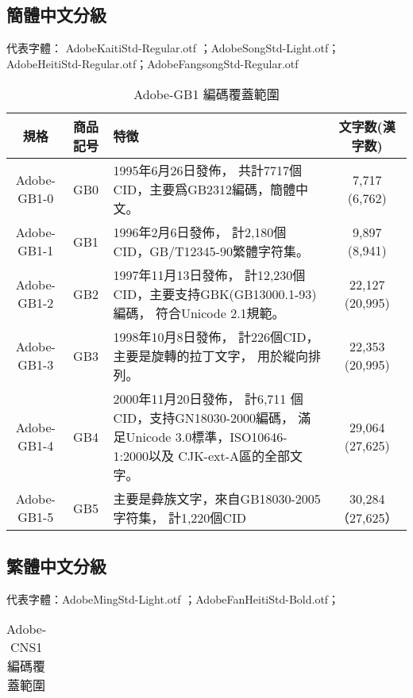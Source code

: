 \documentclass[a4,11pt,uplatex,openleft]{jsarticle}
\begin{document}
\begin{appendix}
\clearpage
\subsection{簡體中文分級}
{\gtfamily 代表字體： AdobeKaitiStd-Regular.otf ；AdobeSongStd-Light.otf；\\
\qquad \qquad \qquad AdobeHeitiStd-Regular.otf；AdobeFangsongStd-Regular.otf}
\begin{table}[h]
\caption{\fontsize{12pt}{15pt}\selectfont Adobe-GB1 編碼覆蓋範圍} %
\centering %
\begin{tabular}{|c|c|p{7cm}|c|}%
\hline  %

規格 & 商品記号	& 特徴	 & 文字数(漢字数) \\

\hline  %
Adobe-GB1-0 &	GB0	 & 1995年6月26日發佈，
共計7717個CID，主要爲GB2312編碼，簡體中文。
& 7,717 (6,762) \\
\hline
Adobe-GB1-1	& GB1 &	1996年2月6日發佈，
計2,180個CID，GB/T12345-90繁體字符集。
& 	9,897 (8,941) \\
\hline
Adobe-GB1-2	& GB2	 &  1997年11月13日發佈，
計12,230個CID，主要支持GBK(GB13000.1-93)編碼，
符合Unicode 2.1規範。 & 22,127 (20,995) \\
\hline

Adobe-GB1-3	& GB3	&   1998年10月8日發佈，
計226個CID，主要是旋轉的拉丁文字，
用於縱向排列。 & 22,353 (20,995) \\

\hline
Adobe-GB1-4	& GB4 & 2000年11月20日發佈，
計6,711 個CID，支持GN18030-2000編碼，
滿足Unicode 3.0標準，ISO10646-1:2000以及 CJK-ext-A區的全部文字。
& 29,064 (27,625) \\
\hline
Adobe-GB1-5	& GB5 & 主要是彜族文字，來自GB18030-2005字符集，
計1,220個CID & 30,284（27,625） \\

\hline %
\end{tabular}

\end{table}

\clearpage
\subsection{繁體中文分級}
{\gtfamily 代表字體：AdobeMingStd-Light.otf ；AdobeFanHeitiStd-Bold.otf；}
\begin{table}[h]
\caption{\fontsize{12pt}{15pt}\selectfont Adobe-CNS1 編碼覆蓋範圍} %
\centering %
\begin{tabular}{|c|c|p{7cm}|c|}%
\hline  %


\end{tabular}
\end{table}
\end{appendix}
\end{document}
